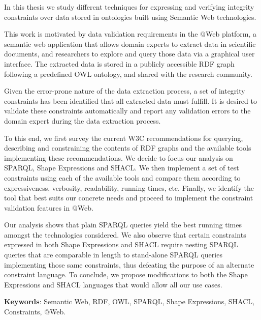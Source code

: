 \documentclass[a4paper, 10pt]{article}
\begin{document}
In this thesis we study different techniques for expressing and verifying
integrity constraints over data stored in ontologies built using Semantic Web
technologies.

This work is motivated by data validation requirements in the @Web platform, a
semantic web application that allows domain experts to extract data in
scientific documents, and researchers to explore and query those data via a
graphical user interface. The extracted data is stored in a publicly
accessible RDF graph following a predefined OWL ontology, and shared with the
research community.

Given the error-prone nature of the data extraction process, a set of
integrity constraints has been identified that all extracted data must
fulfill. It is desired to validate these constraints automatically and report
any validation errors to the domain expert during the data extraction process.

To this end, we first survey the current W3C recommendations for querying,
describing and constraining the contents of RDF graphs and the available tools
implementing these recommendations. We decide to focus our analysis on SPARQL,
Shape Expressions and SHACL. We then implement a set of test constraints using
each of the available tools and compare them according to expressiveness,
verbosity, readability, running times, etc. Finally, we identify the tool that
best suits our concrete needs and proceed to implement the constraint
validation features in @Web.

Our analysis shows that plain SPARQL queries yield the best running times
amongst the technologies considered. We also observe that certain constraints
expressed in both Shape Expressions and SHACL require nesting SPARQL queries
that are comparable in length to stand-alone SPARQL queries implementing those
same constraints, thus defeating the purpose of an alternate constraint
language. To conclude, we propose modifications to both the Shape Expressions
and SHACL languages that would allow all our use cases.

\textbf{Keywords}: Semantic Web, RDF, OWL, SPARQL, Shape Expressions, SHACL,
Constraints, @Web.
\end{document}
